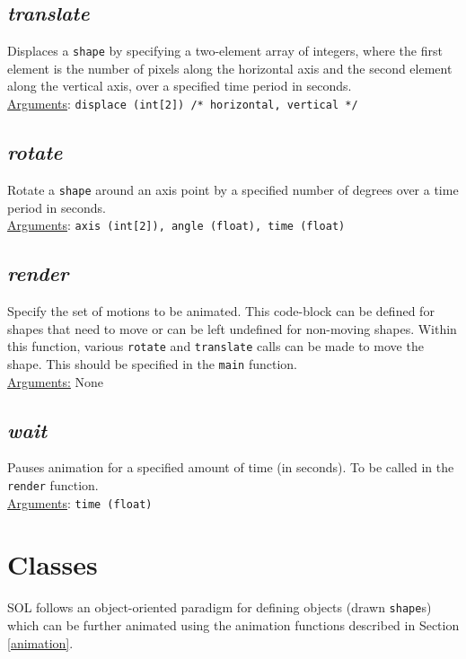 \documentclass[letterpaper,12pt]{article}
\begin{document}
    \subsection{\textit{translate}}
    Displaces a \texttt{shape} by specifying a two-element array of integers, where the first element is the number of pixels along the horizontal axis and the second element along the vertical axis, over a specified time period in seconds.\\
    \underline{Arguments}: \texttt{displace (int[2]) /* horizontal, vertical */}

    \subsection{\textit{rotate}}
    Rotate a \texttt{shape} around an axis point by a specified number of degrees over a time period in seconds.\\
    \underline{Arguments}: \texttt{axis (int[2]), angle (float), time (float)}

    \subsection{\textit{render}}
    Specify the set of motions to be animated. This code-block can be defined for shapes that need to move or can be left undefined for non-moving shapes. Within this function, various \texttt{rotate} and \texttt{translate} calls can be made to move the shape. This should be specified in the \texttt{main} function.\\
    \underline{Arguments:} None

    \subsection{\textit{wait}}
    Pauses animation for a specified amount of time (in seconds). To be called in the \texttt{render} function.\\
    \underline{Arguments}: \texttt{time (float)}


\section{Classes}
SOL follows an object-oriented paradigm for defining objects (drawn \texttt{shape}s) which can be further animated using the animation functions described in Section \ref{animation}.
\end{document}
